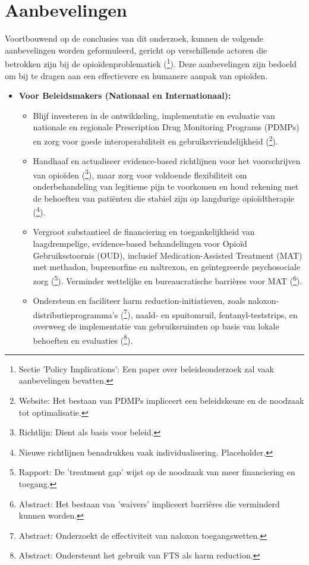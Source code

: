 \documentclass[11pt, a4paper]{report} %
\begin{document}
\chapter{Aanbevelingen}
\label{ch:aanbevelingen}

Voortbouwend op de conclusies van dit onderzoek, kunnen de volgende aanbevelingen worden geformuleerd, gericht op verschillende actoren die betrokken zijn bij de opioïdenproblematiek (\cite{Schuler2020StateScienceOpioidPolicy}\footnote{Sectie 'Policy Implications': Een paper over beleidsonderzoek zal vaak aanbevelingen bevatten.}). Deze aanbevelingen zijn bedoeld om bij te dragen aan een effectievere en humanere aanpak van opioïden.

\begin{itemize}
    \item \textbf{Voor Beleidsmakers (Nationaal en Internationaal):}
        \begin{itemize}
            \item Blijf investeren in de ontwikkeling, implementatie en evaluatie van nationale en regionale Prescription Drug Monitoring Programs (PDMPs) en zorg voor goede interoperabiliteit en gebruiksvriendelijkheid (\cite{CDCPDMPs}\footnote{Website: Het bestaan van PDMPs impliceert een beleidskeuze en de noodzaak tot optimalisatie.}).
            \item Handhaaf en actualiseer evidence-based richtlijnen voor het voorschrijven van opioïden (\cite{Dowell2016CDCGuideline}\footnote{Richtlijn: Dient als basis voor beleid.}), maar zorg voor voldoende flexibiliteit om onderbehandeling van legitieme pijn te voorkomen en houd rekening met de behoeften van patiënten die stabiel zijn op langdurige opioïdtherapie (\cite{Dowell2022CDCGuidelineUpdate}\footnote{Nieuwe richtlijnen benadrukken vaak individualisering. Placeholder.}).
            \item Vergroot substantieel de financiering en toegankelijkheid van laagdrempelige, evidence-based behandelingen voor Opioïd Gebruiksstoornis (OUD), inclusief Medication-Assisted Treatment (MAT) met methadon, buprenorfine en naltrexon, en geïntegreerde psychosociale zorg (\cite{SAMHSA2022NSDUH}\footnote{Rapport: De 'treatment gap' wijst op de noodzaak van meer financiering en toegang.}). Verminder wettelijke en bureaucratische barrières voor MAT (\cite{Jones2015BuprenorphineWaivers}\footnote{Abstract: Het bestaan van 'waivers' impliceert barrières die verminderd kunnen worden.}).
            \item Ondersteun en faciliteer harm reduction-initiatieven, zoals naloxon-distributieprogramma's (\cite{Smart2020NaloxoneAccessLaws}\footnote{Abstract: Onderzoekt de effectiviteit van naloxon toegangswetten.}), naald- en spuitomruil, fentanyl-teststrips, en overweeg de implementatie van gebruiksruimten op basis van lokale behoeften en evaluaties (\cite{Peiper2019FentanylTestStrips}\footnote{Abstract: Ondersteunt het gebruik van FTS als harm reduction.}).

\end{itemize}
\end{itemize}
\end{document}
